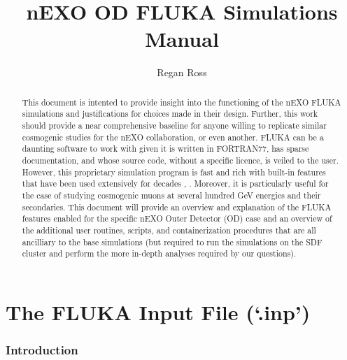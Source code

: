 \documentclass[10pt]{article}
\title{nEXO OD FLUKA Simulations Manual}
\author{Regan Ross}
\begin{document}
\begin{titlepage}
    \maketitle
    \vspace{4cm}
    \centering
\end{titlepage}

\begin{abstract}
    This document is intented to provide insight into the functioning of the nEXO FLUKA simulations and justifications for choices made in their design. Further, this work should provide a near comprehensive baseline for anyone willing to replicate similar cosmogenic studies for the nEXO collaboration, or even another. FLUKA can be a daunting software to work with given it is written in FORTRAN77, has sparse documentation, and whose source code, without a specific licence, is veiled to the user. However, this proprietary simulation program is fast and rich with built-in features that have been used extensively for decades \cite{FLUKA1}, \cite{FLUKA2}. Moreover, it is particularly useful for the case of studying cosmogenic muons at several hundred GeV energies and their secondaries. This document will provide an overview and explanation of the FLUKA features enabled for the specific nEXO Outer Detector (OD) case and an overview of the additional user routines, scripts, and containerization procedures that are all ancilliary to the base simulations (but required to run the simulations on the SDF cluster and perform the more in-depth analyses required by our questions).

\end{abstract}

\vspace{1.5cm}
\listoffigures

\newpage
\tableofcontents

\break
\part*{The FLUKA Input File (`.inp')}
\section{Introduction}
\end{document}
